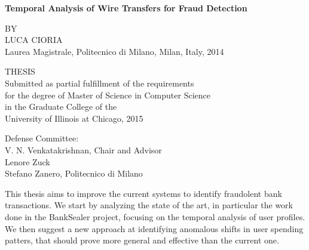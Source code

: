 \documentclass[letterpaper,11pt,oneside,final]{uicthesis}
\newcommand{\thesisTitle}{\textbf{Temporal Analysis of Wire Transfers for Fraud Detection}}
\begin{document}
	\begin{titlepage}
	\vspace*{\fill}
	\begin{spacing}{1.5}
	\begin{center}

		{\Large \thesisTitle}

		\vspace{4.2cm}
    BY\\

    LUCA CIORIA\\
		\vspace{0.2cm}
    Laurea Magistrale, Politecnico di Milano, Milan, Italy, 2014

		\vspace{3.2cm}
    THESIS\\
		\vspace{0.2cm}
    {\linespread{0.6}
    Submitted as partial fulfillment of the requirements\\
    for the degree of Master of Science in Computer Science\\
    in the Graduate College of the\\
  University of Illinois at Chicago, 2015}
		\vspace{0.5cm}
    \begin{flushleft}
      Defense Committee:\\
      \hspace{1cm}V. N. Venkatakrishnan, Chair and Advisor\\
      \hspace{1cm}Lenore Zuck\\
      \hspace{1cm}Stefano Zanero, Politecnico di Milano
    \end{flushleft}

	\end{center}

	\end{spacing}
	\vspace*{\fill}
	\end{titlepage}

	\dedication
		


	\setcounter{tocdepth}{2}
	\tableofcontents
	\listoftables
	\listoffigures

   \summary \label{summary}
   This thesis aims to improve the current systems to identify fraudolent bank transactions. We start by analyzing the state of the art, in particular the work done in the BankSealer project, focusing on the temporal analysis of user profiles. We then suggest a new approach at identifying anomalous shifts in user spending patters, that should prove more general and effective than the current one.
\end{document}
